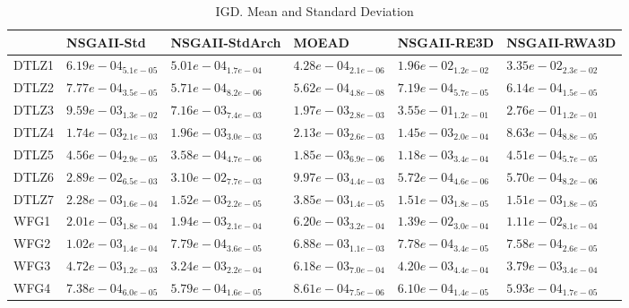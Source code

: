 \documentclass{article}
\begin{document}
\begin{table}
\caption{IGD. Mean and Standard Deviation}
\label{table: IGD}
\centering
\begin{scriptsize}
\begin{tabular}{llllll}
\hline & NSGAII-Std & NSGAII-StdArch & MOEAD & NSGAII-RE3D &  NSGAII-RWA3D\\
\hline 
DTLZ1 & $  6.19e-04_{ 5.1e-05}$ & \cellcolor{gray25}$  5.01e-04_{ 1.7e-04}$ & \cellcolor{gray95}$  4.28e-04_{ 2.1e-06}$ & $  1.96e-02_{ 1.2e-02}$ & $  3.35e-02_{ 2.3e-02}$ \\
DTLZ2 & $  7.77e-04_{ 3.5e-05}$ & \cellcolor{gray25}$  5.71e-04_{ 8.2e-06}$ & \cellcolor{gray95}$  5.62e-04_{ 4.8e-08}$ & $  7.19e-04_{ 5.7e-05}$ & $  6.14e-04_{ 1.5e-05}$ \\
DTLZ3 & $  9.59e-03_{ 1.3e-02}$ & \cellcolor{gray25}$  7.16e-03_{ 7.4e-03}$ & \cellcolor{gray95}$  1.97e-03_{ 2.8e-03}$ & $  3.55e-01_{ 1.2e-01}$ & $  2.76e-01_{ 1.2e-01}$ \\
DTLZ4 & $  1.74e-03_{ 2.1e-03}$ & $  1.96e-03_{ 3.0e-03}$ & $  2.13e-03_{ 2.6e-03}$ & \cellcolor{gray25}$  1.45e-03_{ 2.0e-04}$ & \cellcolor{gray95}$  8.63e-04_{ 8.8e-05}$ \\
DTLZ5 & $  4.56e-04_{ 2.9e-05}$ & \cellcolor{gray95}$  3.58e-04_{ 4.7e-06}$ & $  1.85e-03_{ 6.9e-06}$ & $  1.18e-03_{ 3.4e-04}$ & \cellcolor{gray25}$  4.51e-04_{ 5.7e-05}$ \\
DTLZ6 & $  2.89e-02_{ 6.5e-03}$ & $  3.10e-02_{ 7.7e-03}$ & $  9.97e-03_{ 4.4e-03}$ & \cellcolor{gray25}$  5.72e-04_{ 4.6e-06}$ & \cellcolor{gray95}$  5.70e-04_{ 8.2e-06}$ \\
DTLZ7 & $  2.28e-03_{ 1.6e-04}$ & $  1.52e-03_{ 2.2e-05}$ & $  3.85e-03_{ 1.4e-05}$ & \cellcolor{gray25}$  1.51e-03_{ 1.8e-05}$ & \cellcolor{gray95}$  1.51e-03_{ 1.8e-05}$ \\
WFG1 & \cellcolor{gray25}$  2.01e-03_{ 1.8e-04}$ & \cellcolor{gray95}$  1.94e-03_{ 2.1e-04}$ & $  6.20e-03_{ 3.2e-04}$ & $  1.39e-02_{ 3.0e-04}$ & $  1.11e-02_{ 8.1e-04}$ \\
WFG2 & $  1.02e-03_{ 1.4e-04}$ & $  7.79e-04_{ 3.6e-05}$ & $  6.88e-03_{ 1.1e-03}$ & \cellcolor{gray25}$  7.78e-04_{ 3.4e-05}$ & \cellcolor{gray95}$  7.58e-04_{ 2.6e-05}$ \\
WFG3 & $  4.72e-03_{ 1.2e-03}$ & \cellcolor{gray95}$  3.24e-03_{ 2.2e-04}$ & $  6.18e-03_{ 7.0e-04}$ & $  4.20e-03_{ 4.4e-04}$ & \cellcolor{gray25}$  3.79e-03_{ 3.4e-04}$ \\
WFG4 & $  7.38e-04_{ 6.0e-05}$ & \cellcolor{gray95}$  5.79e-04_{ 1.6e-05}$ & $  8.61e-04_{ 7.5e-06}$ & $  6.10e-04_{ 1.4e-05}$ & \cellcolor{gray25}$  5.93e-04_{ 1.7e-05}$ \\

\end{tabular}
\end{scriptsize}
\end{table}
\end{document}
